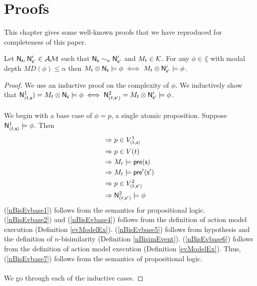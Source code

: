 \chapter{Proofs} \label{chapter:proofs}

This chapter gives some well-known proofs that we have reproduced for completeness of this paper.

\begin{lemma} \label{proof:nBisimilarEventExec}
	Let $\mathrm{\mathsf{N}}_\mathrm{\mathsf{s}}, \mathrm{\mathsf{N}}'_{\mathrm{\mathsf{s}}'} \in \mathcal{AM}$ such that $\mathrm{\mathsf{N}}_\mathrm{\mathsf{s}} \sim_n \mathrm{\mathsf{N}}'_{\mathrm{\mathsf{s}}'}$ and
	$M_t \in \mathcal{K}$.
	For any $\phi \in \lang$ with modal depth $MD(\phi) \leq n$ then $M_t \otimes \mathrm{\mathsf{N}}_\mathrm{\mathsf{s}} \models \phi
	\iff M_t \otimes \mathrm{\mathsf{N}}'_{\mathrm{\mathsf{s}}'} \models \phi$.
\end{lemma}

\begin{proof}
We use an inductive proof on the complexity of $\phi$.
We inductively show that $\mathrm{\mathsf{N}}^1_{(t,\mathrm{\mathsf{s}}}) = M_t \otimes \mathrm{\mathsf{N}}_\mathrm{\mathsf{s}} \models \phi \iff \mathrm{\mathsf{N}}^2_{(t,\mathrm{\mathsf{s}}')} = M_t \otimes
\mathrm{\mathsf{N}}'_{\mathrm{\mathsf{s}}'} \models \phi$.\\
\\
We begin with a base case of $\phi = p$, a single atomic proposition.
Suppose $\mathrm{\mathsf{N}}^1_{(t,\mathrm{\mathsf{s}})} \models \phi$.
Then
\begin{align}
	& \Rightarrow p \in V^1_{(t,\mathrm{\mathsf{s}})} \label{nBisEvbase1} \\
	& \Rightarrow p \in V(t) \label{nBisEvbase2} \\
	& \Rightarrow M_t \models \mathrm{\mathsf{pre}}(\mathrm{\mathsf{s}}) \label{nBisEvbase4} \\
	& \Rightarrow M_t \models \mathrm{\mathsf{pre}}'(\mathrm{\mathsf{s}}') \label{nBisEvbase5} \\
	& \Rightarrow p \in V^2_{(t,\mathrm{\mathsf{s}}')} \label{nBisEvbase6}\\
	& \Rightarrow \mathrm{\mathsf{N}}^2_{(t,\mathrm{\mathsf{s}}')} \models \phi \label{nBisEvbase7}
\end{align}
(\ref{nBisEvbase1}) follows from the semantics for propositional logic.
(\ref{nBisEvbase2}) and (\ref{nBisEvbase4}) follows from the definition of action model execution (Definition
\ref{evModelEx}).
(\ref{nBisEvbase5}) follows from hypothesis and the definition of $n$-bisimilarity (Definition
\ref{nBisimEvent}).
(\ref{nBisEvbase6}) follows from the definition of action model execution (Definition
\ref{evModelEx}).
Thus, (\ref{nBisEvbase7}) follows from the semantics of propositional logic.\\
\\
We go through each of the inductive cases.

\end{proof}
